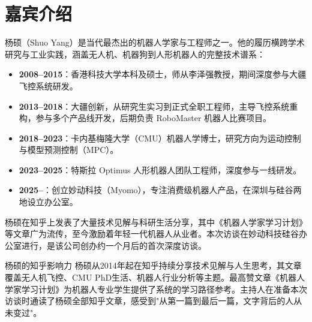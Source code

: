 \section{嘉宾介绍}

杨硕（Shuo Yang）是当代最杰出的机器人学家与工程师之一。他的履历横跨学术研究与工业实践，涵盖无人机、机器狗到人形机器人的完整技术谱系：

\begin{itemize}
    \item \textbf{2008--2015}：香港科技大学本科及硕士，师从李泽强教授，期间深度参与大疆飞控系统研发。
    \item \textbf{2013--2018}：大疆创新，从研究生实习到正式全职工程师，主导飞控系统重构，参与多个产品线开发，后期负责 RoboMaster 机器人比赛项目。
    \item \textbf{2018--2023}：卡内基梅隆大学（CMU）机器人学博士，研究方向为运动控制与模型预测控制（MPC）。
    \item \textbf{2023--2025}：特斯拉 Optimus 人形机器人团队工程师，深度参与一线研发。
    \item \textbf{2025--}：创立妙动科技（Myomo），专注消费级机器人产品，在深圳与硅谷两地设立办公室。
\end{itemize}

杨硕在知乎上发表了大量技术见解与科研生活分享，其中《机器人学家学习计划》等文章广为流传，至今激励着年轻一代机器人从业者。本次访谈在妙动科技硅谷办公室进行，是该公司创办约一个月后的首次深度访谈。

\begin{knowledgebox}{杨硕的知乎影响力}
杨硕从2014年起在知乎持续分享技术见解与人生思考，其文章覆盖无人机飞控、CMU PhD生活、机器人行业分析等主题。最高赞文章《机器人学家学习计划》为机器人专业学生提供了系统的学习路径参考。主持人在准备本次访谈时通读了杨硕全部知乎文章，感受到"从第一篇到最后一篇，文字背后的人从未变过"。
\end{knowledgebox}


